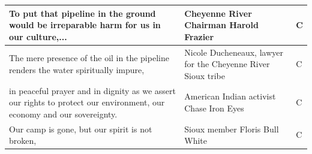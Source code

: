 \begin{footnotesize}
\begin{spacing}{1}
\begin{longtable}{| p{} | P{.25\textwidth} | p{.07\textwidth}|}
To put that pipeline in the ground would be irreparable harm for us in our culture,...                & Cheyenne River Chairman Harold Frazier       & C              \\ \hline
The mere presence of the oil in the pipeline renders the water spiritually impure,                  & Nicole Ducheneaux, lawyer for the Cheyenne River Sioux tribe                                                   & C              \\ \hline
in peaceful prayer and in dignity as we assert our rights to protect our environment, our economy and our sovereignty.                                                & American Indian activist Chase Iron Eyes     & C              \\ \hline
Our camp is gone, but our spirit is not broken,                                                     & Sioux member Floris Bull White               & C              \\ \hline
\end{longtable}
\end{spacing}
\end{footnotesize}